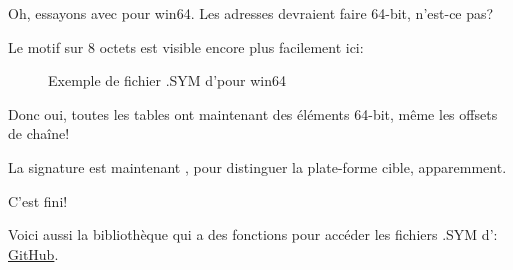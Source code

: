 \clearpage
Oh, essayons avec \oracle pour win64.
Les adresses devraient faire 64-bit, n'est-ce pas?

Le motif sur 8 octets est visible encore plus facilement ici:

\begin{figure}[H]
\centering
{}
\caption{Exemple de fichier .SYM d'\oracle pour win64}
\label{fig:oracle_SYM_whole64}
\end{figure}

Donc oui, toutes les tables ont maintenant des éléments 64-bit, même les offsets
de chaîne!

La signature est maintenant , pour distinguer la plate-forme cible,
apparemment.

C'est fini!

Voici aussi la bibliothèque qui a des fonctions pour accéder les fichiers .SYM
d'\oracle:
\href{http://go.yurichev.com/17007}{GitHub}.
